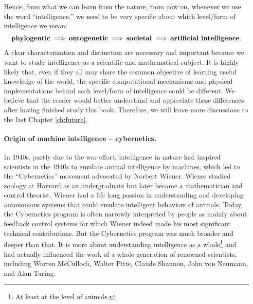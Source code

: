 \documentclass[../../book-main.tex]{subfiles}
\begin{document}
Hence, from what we can learn from the nature, from now on, whenever we use the word ``intelligence,'' we need to be very specific about which level/form of intelligence we mean:
\begin{equation}
\mbox{\textbf{phylogentic}} \;
   \Longrightarrow \; \mbox{\textbf{ontogenetic}} \; \Longrightarrow \; 
   \mbox{\textbf{societal}}
   \; \Longrightarrow \; 
   \mbox{\textbf{artificial intelligence}}.
\end{equation}
A clear characterization and distinction are necessary and important because we want to study intelligence as a scientific and mathematical subject. It is highly likely that, even if they all may share the common objective of learning useful knowledge of the world, the specific computational mechanisms and physical implementations behind each level/form of intelligence could be different. We believe that the reader would better understand and appreciate these differences after having finished study this book. Therefore, we will leave more discussions to the last Chapter \ref{ch:future}.





\paragraph{Origin of machine intelligence -- cybernetics.}
In 1940s, partly due to the war effort, intelligence in nature had inspired scientists in the 1940s to emulate animal intelligence by machines, which led to the ``Cybernetics''  movement advocated by Norbert Wiener. Wiener studied zoology at Harvard as an undergraduate but later became a mathematician and control theorist. Wiener had a life long passion in understanding and developing autonomous systems that could emulate intelligent behaviors of animals. Today, the Cybernetics program is often narrowly interpreted by people as mainly about feedback control systems for which Wiener indeed made his most significant technical contributions. But the Cybernetics program was much broader and deeper than that. It is more about understanding intelligence as a whole\footnote{At least at the level of animals.} and had actually influenced the work of a whole generation of renowned scientists, including Warren McCulloch, Walter Pitts, Claude Shannon, John von Neumann, and Alan Turing.  
\end{document}
